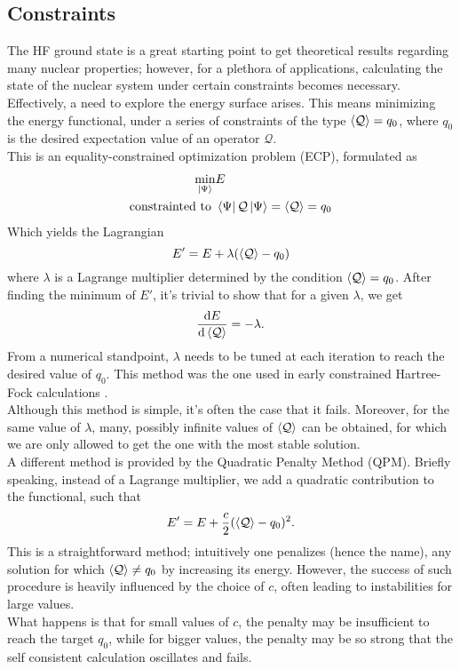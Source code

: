 \subsection{Constraints}
\label{sec:alm}
The HF ground state is a great starting point to get theoretical results regarding many nuclear properties; however, for a plethora of applications, calculating the state of the nuclear system under certain constraints becomes necessary.
\\Effectively, a need to explore the energy surface arises. This means minimizing the energy functional, under a series of constraints of the type $\expval{ {\mathcal Q}}=q_0$, where $q_0$ is the desired expectation value of an operator ${\mathcal Q}$.
\\This is an equality-constrained optimization problem (ECP), formulated as
\begin{align}
\min_{\ket \Psi}&E 
\\\text{constrainted to } &\bra{\Psi} {\mathcal Q} \ket {\Psi} = \expval{ {\mathcal Q}} = q_0
\end{align}
Which yields the Lagrangian
\begin{equation}
    \label{eq:constr_lagrangian}
    E' = E + \lambda (\expval{{\mathcal Q}}-q_0)
\end{equation}
where $\lambda$ is a Lagrange multiplier determined by the condition $\expval {{\mathcal Q}} = q_0$. 
After finding the minimum of $E'$, it's trivial to show that for a given $\lambda$, we get \cite{FLOCARD1973433}
\begin{equation}
\dv{E}{\expval{{\mathcal Q}}} = -\lambda. 
\end{equation}
From a numerical standpoint, $\lambda$ needs to be tuned at each iteration to reach the desired value of $q_0$. 
This method was the one used in early constrained Hartree-Fock calculations \cite{Cusson1985}.
\\Although this method is simple, it's often the case that it fails. Moreover, for the same value of $\lambda$, many, possibly infinite values of $\expval{{\mathcal Q}}$ can be obtained, for which we are only allowed to get the one with the most stable solution.
\\A different method is provided by the Quadratic Penalty Method (QPM). Briefly speaking, instead of a Lagrange multiplier, we add a quadratic contribution to the functional, such that
\begin{equation}
    \label{eq:constr_quadratic}
    E' = E + \frac c 2 (\expval{{\mathcal Q}}-q_0)^2.
\end{equation}
This is a straightforward method; intuitively one penalizes (hence the name), any solution for which $\expval{{\mathcal Q}}\neq q_0$ by increasing its energy. However, the success of such procedure is heavily influenced by the choice of $c$, often leading to instabilities for large values.
\\What happens is that for small values of $c$, the penalty may be insufficient to reach the target $q_0$, while for bigger values, the penalty may be so strong that the self consistent calculation oscillates and fails.
